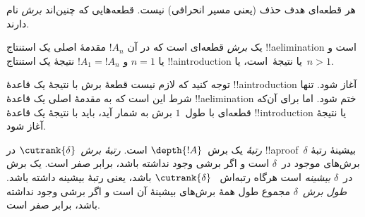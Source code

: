 \documentclass[../../../include/open-logic-section]{subfiles}
\begin{document}
هر قطعه‌ای هدف حذف (یعنی مسیر انحرافی) نیست. قطعه‌هایی که چنین‌اند
\emph{برش} نام دارند.

\begin{defn}
یک \emph{برش} قطعه‌ای است که در آن $!A_n$ مقدمهٔ اصلی یک استنتاج
!!a{elimination} است و یا $n=1$ و $!A_1 = !A_n$ نتیجهٔ یک استنتاج
!!a{introduction} یا نتیجهٔ~\FalseInt است، یا~$n>1$.
\end{defn}

توجه کنید که لازم نیست قطعهٔ برش با نتیجهٔ یک قاعدهٔ !!a{introduction}
آغاز شود. تنها شرط این است که به مقدمهٔ اصلی یک قاعدهٔ
!!a{elimination} ختم شود. اما برای آن‌که قطعه‌ای با طول~$1$ برش به شمار
آید، باید با نتیجهٔ یک قاعدهٔ !!{introduction} یا نتیجهٔ \FalseInt آغاز
شود.

\begin{defn}
\emph{رتبهٔ} یک برش~$\depth{!A}$ است. \emph{رتبهٔ
برش}~$\cutrank{\delta}$ در !!a{proof}~$\delta$ بیشینهٔ رتبهٔ برش‌های
موجود در~$\delta$ است و اگر برشی وجود نداشته باشد، برابر صفر است. یک
برش در~$\delta$ \emph{بیشینه} است هرگاه رتبه‌اش
~$\cutrank{\delta}$ باشد، یعنی رتبهٔ بیشینه داشته باشد. \emph{طول
برش}~$\delta$ مجموع طول همهٔ برش‌های بیشینهٔ آن است و اگر برشی وجود
نداشته باشد، برابر صفر است.
\end{defn}
\end{document}
